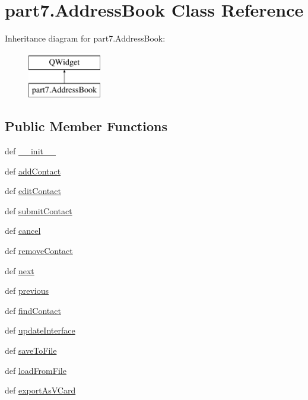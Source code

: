 \hypertarget{classpart7_1_1AddressBook}{}\section{part7.\+Address\+Book Class Reference}
\label{classpart7_1_1AddressBook}
Inheritance diagram for part7.\+Address\+Book\+:\begin{figure}[H]
\begin{center}
\leavevmode
\includegraphics[height=2.000000cm]{classpart7_1_1AddressBook}
\end{center}
\end{figure}
\subsection*{Public Member Functions}
\begin{DoxyCompactItemize}
\item 
def \hyperlink{classpart7_1_1AddressBook_a13716ed0b38a22fd17dda51497857ac4}{\+\_\+\+\_\+init\+\_\+\+\_\+}
\item 
def \hyperlink{classpart7_1_1AddressBook_a43314ae061a2d6ce8b6fc948eddeb45c}{add\+Contact}
\item 
def \hyperlink{classpart7_1_1AddressBook_a992aed075f918b92abbe49d9f76b63c8}{edit\+Contact}
\item 
def \hyperlink{classpart7_1_1AddressBook_a39328cd6e86731a95167140fbaa08662}{submit\+Contact}
\item 
def \hyperlink{classpart7_1_1AddressBook_a315ed9a730360c1c238d75cb2e469fb9}{cancel}
\item 
def \hyperlink{classpart7_1_1AddressBook_ac97adedad3320926b2c7f641e9a9fcc7}{remove\+Contact}
\item 
def \hyperlink{classpart7_1_1AddressBook_ae4601da0f56721299fa8af76166fd7f8}{next}
\item 
def \hyperlink{classpart7_1_1AddressBook_af3c8e3c7c07dd91c2827509d832f0f0d}{previous}
\item 
def \hyperlink{classpart7_1_1AddressBook_ab3e087680afdf8c770760c3f2803b71c}{find\+Contact}
\item 
def \hyperlink{classpart7_1_1AddressBook_a8f4c7ed09f9ba065501ebabf485cb8cb}{update\+Interface}
\item 
def \hyperlink{classpart7_1_1AddressBook_afc747fdcae2b04a5a29535a67682d8f3}{save\+To\+File}
\item 
def \hyperlink{classpart7_1_1AddressBook_a5a3a0e3bed95fa040e65c93d245dcb3f}{load\+From\+File}
\item 
def \hyperlink{classpart7_1_1AddressBook_a3381f816bf72d653959df8b1ad2d7386}{export\+As\+V\+Card}
\end{DoxyCompactItemize}
